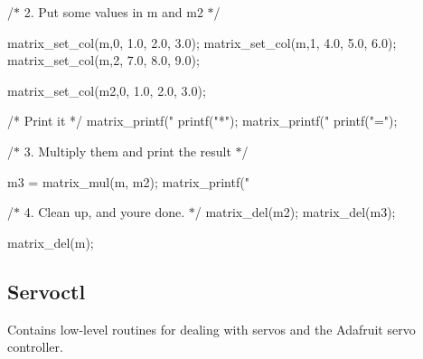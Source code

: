 {\ttfamily /$\ast$ 2. Put some values in m and m2 $\ast$/ \begin{DoxyVerb}matrix_set_col(m,0, 1.0, 2.0, 3.0);
matrix_set_col(m,1, 4.0, 5.0, 6.0);
matrix_set_col(m,2, 7.0, 8.0, 9.0);

matrix_set_col(m2,0, 1.0, 2.0, 3.0);

/* Print it */
matrix_printf("%
printf("*\n");
matrix_printf("%
printf("=\n");
\end{DoxyVerb}
}

{\ttfamily /$\ast$ 3. Multiply them and print the result $\ast$/ \begin{DoxyVerb}m3 = matrix_mul(m, m2);
matrix_printf("%
\end{DoxyVerb}
}

{\ttfamily /$\ast$ 4. Clean up, and you\textquotesingle{}re done. $\ast$/ matrix\+\_\+del(m2); matrix\+\_\+del(m3);}

{\ttfamily  matrix\+\_\+del(m); }

\subsection*{Servoctl}

Contains low-\/level routines for dealing with servos and the Adafruit servo controller. 